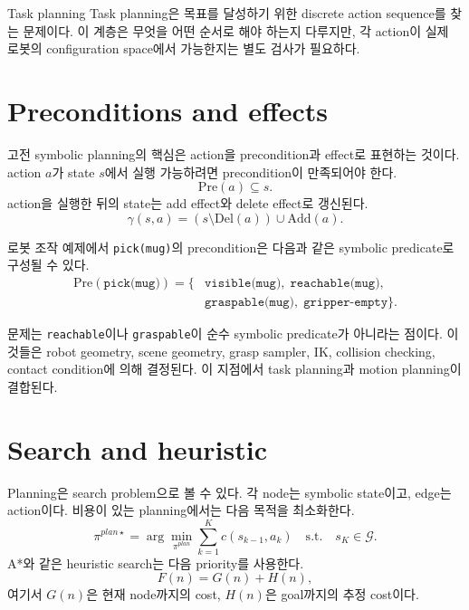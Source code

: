 \begin{definitionbox}{Task planning}
Task planning은 목표를 달성하기 위한 discrete action sequence를 찾는 문제이다. 이 계층은 무엇을 어떤 순서로 해야 하는지 다루지만, 각 action이 실제 로봇의 configuration space에서 가능한지는 별도 검사가 필요하다.
\end{definitionbox}

\section{Preconditions and effects}

고전 symbolic planning의 핵심은 action을 precondition과 effect로 표현하는 것이다. action $a$가 state $s$에서 실행 가능하려면 precondition이 만족되어야 한다.
\begin{equation}
  \mathrm{Pre}(a) \subseteq s.
  \label{eq:precondition}
\end{equation}
action을 실행한 뒤의 state는 add effect와 delete effect로 갱신된다.
\begin{equation}
  \gamma(s,a)
  =
  (s \setminus \mathrm{Del}(a)) \cup \mathrm{Add}(a).
  \label{eq:add-delete-effect}
\end{equation}

로봇 조작 예제에서 \texttt{pick(mug)}의 precondition은 다음과 같은 symbolic predicate로 구성될 수 있다.
\begin{equation}
  \begin{aligned}
  \mathrm{Pre}(\texttt{pick(mug)})
  =
  \{&
  \texttt{visible(mug)},\;
  \texttt{reachable(mug)},\\
  &
  \texttt{graspable(mug)},\;
  \texttt{gripper-empty}
  \}.
  \end{aligned}
  \label{eq:pick-preconditions}
\end{equation}

문제는 \texttt{reachable}이나 \texttt{graspable}이 순수 symbolic predicate가 아니라는 점이다. 이것들은 robot geometry, scene geometry, grasp sampler, IK, collision checking, contact condition에 의해 결정된다. 이 지점에서 task planning과 motion planning이 결합된다.

\section{Search and heuristic}

Planning은 search problem으로 볼 수 있다. 각 node는 symbolic state이고, edge는 action이다. 비용이 있는 planning에서는 다음 목적을 최소화한다.
\begin{equation}
  \pi^{plan\star}
  =
  \arg\min_{\pi^{plan}}
  \sum_{k=1}^{K} c(s_{k-1},a_k)
  \quad
  \text{s.t.}\quad
  s_K\in\mathcal{G}.
  \label{eq:planning-cost}
\end{equation}
A*와 같은 heuristic search는 다음 priority를 사용한다.
\begin{equation}
  F(n)=G(n)+H(n),
  \label{eq:a-star}
\end{equation}
여기서 $G(n)$은 현재 node까지의 cost, $H(n)$은 goal까지의 추정 cost이다.

